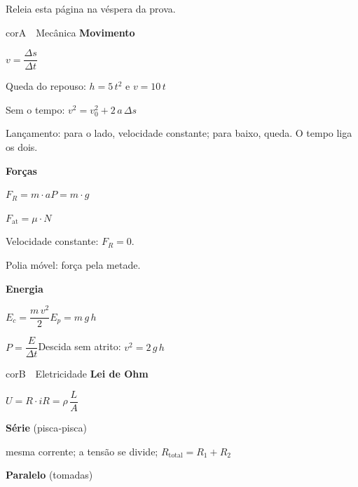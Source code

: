 \clearpage
{}\label{pg:bolso}
Releia esta página na véspera da prova.

\begin{tcbraster}[fileira=3,raster column skip=2.5mm]
\begin{bolso}{corA}{\faCarSide\ \ Mecânica}
\textbf{Movimento}\par
$v = \dfrac{\Delta s}{\Delta t}$\par\smallskip
Queda do repouso: $h = 5\,t^2$ e $v = 10\,t$\par
Sem o tempo: $v^2 = v_0^2 + 2\,a\,\Delta s$\par\smallskip
Lançamento: para o lado, velocidade constante; para baixo, queda. O tempo liga os dois.\par\medskip
\textbf{Forças}\par
$F_R = m \cdot a$\qquad $P = m \cdot g$\par
$F_{\text{at}} = \mu \cdot N$\par\smallskip
Velocidade constante: $F_R = 0$.\par
Polia móvel: força pela metade.\par\medskip
\textbf{Energia}\par
$E_c = \dfrac{m\,v^2}{2}$\quad $E_p = m\,g\,h$\par\smallskip
$P = \dfrac{E}{\Delta t}$\quad Descida sem atrito: $v^2 = 2\,g\,h$
\par\medskip\centering
{}
\end{bolso}
\begin{bolso}{corB}{\faBolt\ \ Eletricidade}
\textbf{Lei de Ohm}\par
$U = R \cdot i$\qquad $R = \rho\,\dfrac{L}{A}$\par\medskip
\textbf{Série} (pisca‑pisca)\par
mesma corrente; a tensão se divide; $R_{\text{total}} = R_1 + R_2$\par\smallskip
\textbf{Paralelo} (tomadas)\par

\end{bolso}
\end{tcbraster}
